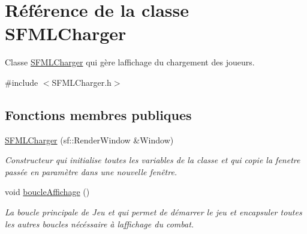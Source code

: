 \hypertarget{class_s_f_m_l_charger}{}\section{Référence de la classe S\+F\+M\+L\+Charger}
\label{class_s_f_m_l_charger}


Classe \hyperlink{class_s_f_m_l_charger}{S\+F\+M\+L\+Charger} qui gère l\textquotesingle{}affichage du chargement des joueurs.  




{\ttfamily \#include $<$S\+F\+M\+L\+Charger.\+h$>$}

\subsection*{Fonctions membres publiques}
\begin{DoxyCompactItemize}
\item 
\hyperlink{class_s_f_m_l_charger_a2b47aabcd697f29be30d47d84321ba7e}{S\+F\+M\+L\+Charger} (sf\+::\+Render\+Window \&Window)
\begin{DoxyCompactList}\small\item\em Constructeur qui initialise toutes les variables de la classe et qui copie la fenetre passée en paramètre dans une nouvelle fenêtre. \end{DoxyCompactList}\item 
\mbox{\label{class_s_f_m_l_charger_ae0c05ca2ca2080579fe94cc5e8f8b00c}} 
void \hyperlink{class_s_f_m_l_charger_ae0c05ca2ca2080579fe94cc5e8f8b00c}{boucle\+Affichage} ()
\begin{DoxyCompactList}\small\item\em La boucle principale de Jeu et qui permet de démarrer le jeu et encapsuler toutes les autres boucles nécéssaire à l\textquotesingle{}affichage du combat. \end{DoxyCompactList}\end{DoxyCompactItemize}
